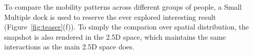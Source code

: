  To compare the mobility patterns across different groups of people, a Small Multiple dock is used to reserve the ever explored interesting result (Figure~\ref{fig:teaser}(f)). To simply the comparion over spatial distribution, the snapshot is also rendered in the 2.5D space, which maintains the same interactions as the main 2.5D space does.

